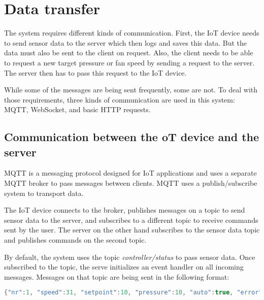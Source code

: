 
\section{Data transfer}
\label{sec:data_transfer}

The system requires different kinds of communication. First, the IoT device needs to send sensor data to the server which then logs and saves this data. But the data must also be sent to the client on request. Also, the client needs to be able to request a new target pressure or fan speed by sending a request to the server. The server then has to pass this request to the IoT device.

While some of the messages are being sent frequently, some are not. To deal with those requirements, three kinds of communication are used in this system: MQTT, WebSocket, and basic HTTP requests.



\subsection{Communication between the oT device and the server}
\label{subsec:communication_between_the_iot_device_and_the_server}

MQTT is a messaging protocol designed for IoT applications and uses a separate MQTT broker to pass messages between clients. MQTT uses a publish/subscribe system to transport data.

The IoT device connects to the broker, publishes messages on a topic to send sensor data to the server, and subscribes to a different topic to receive commands sent by the user. The server on the other hand subscribes to the sensor data topic and publishes commands on the second topic.

By default, the system uses the topic \textit{controller/status} to pass sensor data. Once subscribed to the topic, the serve initializes an event handler on all incoming messages. Messages on that topic are being sent in the following format:

\begin{lstlisting}[language = Java, numbers = none]
 {"nr":1, "speed":31, "setpoint":10, "pressure":10, "auto":true, "error":false}
\end{lstlisting}

